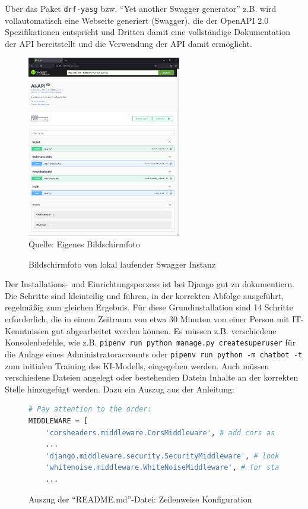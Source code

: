 \documentclass[12pt,oneside,titlepage,listof=totoc,bibliography=totoc]{scrartcl}
\newcommand{\code}[1]{\colorbox{code-gray}{\texttt{#1}}}
\begin{document}
Über das Paket \code{drf-yasg} bzw. \enquote{Yet another Swagger generator} z.B. wird vollautomatisch eine Webseite generiert (Swagger), die der OpenAPI 2.0 Spezifikationen entspricht und Dritten damit eine vollständige Dokumentation der API bereitstellt und die Verwendung der API damit ermöglicht. 

\begin{figure}[H]
	\caption{Bildschirmfoto von lokal laufender Swagger Instanz}\label{fig:local-swagger}
	\includegraphics[width=0.60\textwidth]{swagger.png}
	\\
	Quelle: Eigenes Bildschirmfoto
\end{figure}


Der Installations- und Einrichtungsporzess ist bei Django gut zu dokumentiern. Die Schritte sind kleinteilig und führen, in der korrekten Abfolge ausgeführt, regelmäßig zum gleichen Ergebnis. Für diese Grundinstallation sind 14 Schritte erforderlich, die in einem Zeitraum von etwa 30 Minuten von einer  Person mit IT-Kenntnissen gut abgearbeitet werden können. Es müssen z.B. verschiedene Konsolenbefehle, wie z.B. \code{pipenv run python manage.py createsuperuser} für die Anlage eines Administratoraccounts oder \code{pipenv run python -m chatbot -t} zum initialen Training des KI-Modells, eingegeben werden. Auch müssen verschiedene Dateien angelegt oder bestehenden Datein Inhalte an der korrekten Stelle hinzugefügt werden. Dazu ein Auszug aus der Anleitung: 

\begin{figure}[H]
	\caption{Auszug der \enquote{README.md}-Datei: Zeilenweise Konfiguration}
	\label{fig:code-django-readme}
\begin{lstlisting}[language=python]
# Pay attention to the order:
MIDDLEWARE = [
    'corsheaders.middleware.CorsMiddleware', # add cors as the first line
    ...
    'django.middleware.security.SecurityMiddleware', # look out for this line and insert whitenoise below
    'whitenoise.middleware.WhiteNoiseMiddleware', # for static files
    ...
\end{lstlisting}
\end{figure}
\end{document}
